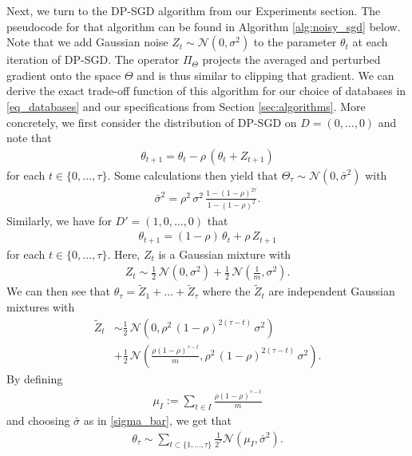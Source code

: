 Next, we turn to the DP-SGD algorithm from our Experiments section. The pseudocode for that algorithm can be found in Algorithm \ref{alg:noisy_sgd} below. Note that we add Gaussian noise $Z_t \sim \mathcal{N}(0, \sigma^2)$ to the parameter $\theta_t$ at each iteration of DP-SGD. The operator $\Pi_{\Theta}$ projects the averaged and perturbed gradient onto the space $\Theta$ and is thus similar to clipping that gradient. We can derive the exact trade-off function of this algorithm for our choice of databases in \eqref{eq_databases} and our specifications from Section \ref{sec:algorithms}. More concretely, we first consider the distribution of DP-SGD on $D = (0, \dots, 0)$ and note that 
\begin{align*}
    \theta_{t+1} = \theta_t - \rho \, (\theta_t + Z_{t+1}) 
\end{align*}
for each $t \in \{0, \dots, \tau\}$. Some calculations then yield that $\Theta_{\tau} \sim \mathcal{N}(0, \bar{\sigma}^2)$ with 
\begin{align} \label{sigma_bar}
    \bar{\sigma}^2 = \rho^2 \, \sigma^2 \, \frac{1 - (1 - \rho)^{2 \tau}}{1 - (1 - \rho)^{2}}.
\end{align}
Similarly, we have for $D' = (1, 0, \dots, 0)$ that 
\begin{align*}
     \theta_{t+1} = (1 - \rho) \, \theta_t + \rho \,  Z_{t+1} 
\end{align*}
for each $t \in \{0, \dots, \tau\}$. Here, $Z_t$ is a Gaussian mixture with 
\begin{align*}
    Z_t \sim \frac{1}{2} \, \mathcal{N}\left(0,\sigma^2\right) + \frac{1}{2} \, \mathcal{N}\left(\frac{1}{m},\sigma^2\right).
\end{align*}
We can then see that $ \theta_{\tau} = \tilde{Z}_1 + \dots + \tilde{Z}_{\tau} $
where the $\tilde{Z}_t$ are independent Gaussian mixtures with
\begin{align*}
    \tilde{Z}_t & \sim \frac{1}{2} \, \mathcal{N}\left(0, \rho^2 \, (1- \rho)^{2 (\tau - t)} \, \sigma^2\right) \\ & + \frac{1}{2} \, \mathcal{N}\left(\frac{\rho (1 - \rho)^{\tau - t}}{m}, \rho^2 \, (1- \rho)^{2 (\tau - t)} \, \sigma^2\right).
\end{align*}
By defining 
\begin{align} \label{mu_I}
    \mu_I := \sum\limits_{t \in I} \frac{\rho (1 - \rho)^{\tau - t}}{m}
\end{align}
and choosing $\bar{\sigma}$ as in \eqref{sigma_bar}, we get that
\begin{align*}
    \theta_{\tau} \sim \sum\limits_{t \subset \{1, \dots, \tau\}} \frac{1}{2^{\tau}} \mathcal{N}(\mu_I, \bar{\sigma}^2).
\end{align*}
